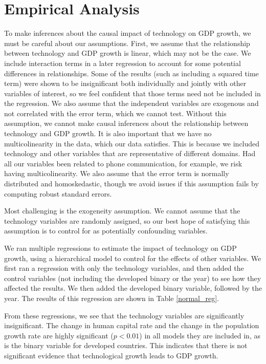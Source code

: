 \documentclass[11pt]{texMemo}
\begin{document}
\section{Empirical Analysis}

To make inferences about the causal impact of technology on GDP growth, we must be careful about our assumptions.
First, we assume that the relationship between technology and GDP growth is linear, which may not be the case.
We include interaction terms in a later regression to account for some potential differences in relationships.
Some of the results (such as including a squared time term) were shown to be insignificant both individually and jointly with other variables of interest, so we feel confident that those terms need not be included in the regression.
We also assume that the independent variables are exogenous and not correlated with the error term, which we cannot test.
Without this assumption, we cannot make causal inferences about the relationship between technology and GDP growth.
It is also important that we have no multicolinearity in the data, which our data satisfies.
This is because we included technology and other variables that are representative of different domains.
Had all our variables been related to phone communication, for example, we risk having multicolinearity.
We also assume that the error term is normally distributed and homoskedastic, though we avoid issues if this assumption fails by computing robust standard errors.

Most challenging is the exogeneity assumption.
We cannot assume that the technology variables are randomly assigned, so our best hope of satisfying this assumption is to control for as potentially confounding variables.

We ran multiple regressions to estimate the impact of technology on GDP growth, using a hierarchical model to control for the effects of other variables.
We first ran a regression with only the technology variables, and then added the control variables (not including the developed binary or the year) to see how they affected the results.
We then added the developed binary variable, followed by the year.
The results of this regression are shown in Table \ref{normal_reg}.



From these regressions, we see that the technology variables are significantly insignificant.
The change in human capital rate and the change in the population growth rate are highly significant ($p < 0.01$) in all models they are included in, as is the binary variable for developed countries.
This indicates that there is not significant evidence that technological growth leads to GDP growth.
\end{document}
